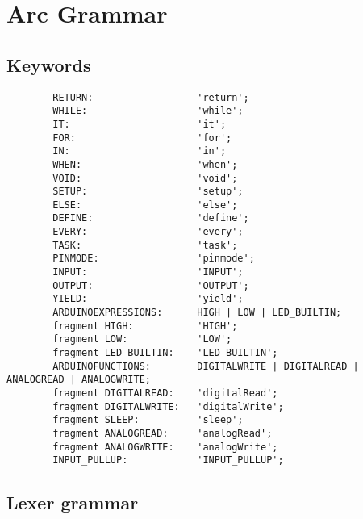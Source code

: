 \chapter{Arc Grammar}\label{app:grammar}
\section{Keywords}
\begin{listing}[htb!]
    \begin{verbatim}
        RETURN:                  'return';
        WHILE:                   'while';
        IT:                      'it';
        FOR:                     'for';
        IN:                      'in';
        WHEN:                    'when';
        VOID:                    'void';
        SETUP:                   'setup';
        ELSE:                    'else';
        DEFINE:                  'define';
        EVERY:                   'every';
        TASK:                    'task';
        PINMODE:                 'pinmode';
        INPUT:                   'INPUT';
        OUTPUT:                  'OUTPUT';
        YIELD:                   'yield';
        ARDUINOEXPRESSIONS:      HIGH | LOW | LED_BUILTIN; 
        fragment HIGH:           'HIGH';
        fragment LOW:            'LOW';
        fragment LED_BUILTIN:    'LED_BUILTIN';
        ARDUINOFUNCTIONS:        DIGITALWRITE | DIGITALREAD | ANALOGREAD | ANALOGWRITE;
        fragment DIGITALREAD:    'digitalRead';
        fragment DIGITALWRITE:   'digitalWrite';
        fragment SLEEP:          'sleep';
        fragment ANALOGREAD:     'analogRead';
        fragment ANALOGWRITE:    'analogWrite';
        INPUT_PULLUP:            'INPUT_PULLUP';
    \end{verbatim}
\end{listing}


\clearpage
\section{Lexer grammar}

